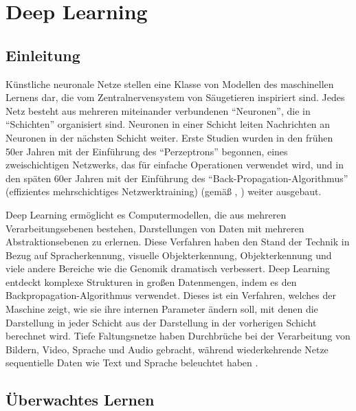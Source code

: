 \chapter{Deep Learning} \label{ch2}
\section{Einleitung}
Künstliche neuronale Netze stellen eine Klasse von Modellen des maschinellen Lernens dar, die vom Zentralnervensystem von Säugetieren inspiriert sind. Jedes Netz besteht aus mehreren miteinander verbundenen \enquote{Neuronen}, die in \enquote{Schichten} organisiert sind. Neuronen in einer Schicht leiten Nachrichten an Neuronen in der nächsten Schicht weiter. Erste Studien wurden in den frühen 50er Jahren mit der Einführung des \enquote{Perzeptrons} \cite{Rosenblatt} begonnen, eines zweischichtigen Netzwerks, das für einfache Operationen verwendet wird, und in den späten 60er Jahren mit der Einführung des \enquote{Back-Propagation-Algorithmus} (effizientes mehrschichtiges Netzwerktraining) (gemäß \cite{Werbos1990}, \cite{Hinton}) weiter ausgebaut.



Deep Learning ermöglicht es Computermodellen, die aus mehreren Verarbeitungsebenen bestehen, Darstellungen von Daten mit mehreren Abstraktionsebenen zu erlernen. Diese Verfahren haben den Stand der Technik in Bezug auf Spracherkennung, visuelle Objekterkennung, Objekterkennung und viele andere Bereiche wie die Genomik dramatisch verbessert. Deep Learning entdeckt komplexe Strukturen in großen Datenmengen, indem es den Backpropagation-Algorithmus verwendet. Dieses ist ein Verfahren, welches der Maschine zeigt, wie sie ihre internen Parameter ändern soll, mit denen die Darstellung in jeder Schicht aus der Darstellung in der vorherigen Schicht berechnet wird. Tiefe Faltungsnetze haben Durchbrüche bei der Verarbeitung von Bildern, Video, Sprache und Audio gebracht, während wiederkehrende Netze sequentielle Daten wie Text und Sprache beleuchtet haben \cite*{Lecun2015}.


\section{Überwachtes Lernen}


